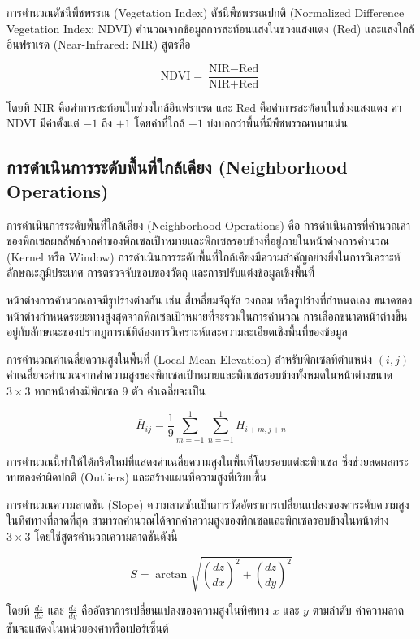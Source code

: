 \begin{ex}
การคำนวณดัชนีพืชพรรณ (Vegetation Index) ดัชนีพืชพรรณปกติ (Normalized Difference Vegetation Index: NDVI) คำนวณจากข้อมูลการสะท้อนแสงในช่วงแสงแดง (Red) และแสงใกล้อินฟราเรด (Near-Infrared: NIR) สูตรคือ

\[
\text{NDVI} = \frac{\text{NIR} - \text{Red}}{\text{NIR} + \text{Red}}
\]

โดยที่ NIR คือค่าการสะท้อนในช่วงใกล้อินฟราเรด และ Red คือค่าการสะท้อนในช่วงแสงแดง ค่า NDVI มีค่าตั้งแต่ $-1$ ถึง $+1$ โดยค่าที่ใกล้ $+1$ บ่งบอกว่าพื้นที่มีพืชพรรณหนาแน่น
\end{ex}

\subsection{การดำเนินการระดับพื้นที่ใกล้เคียง (Neighborhood Operations)}

การดำเนินการระดับพื้นที่ใกล้เคียง (Neighborhood Operations) คือ การดำเนินการที่คำนวณค่าของพิกเซลผลลัพธ์จากค่าของพิกเซลเป้าหมายและพิกเซลรอบข้างที่อยู่ภายในหน้าต่างการคำนวณ (Kernel หรือ Window) การดำเนินการระดับพื้นที่ใกล้เคียงมีความสำคัญอย่างยิ่งในการวิเคราะห์ลักษณะภูมิประเทศ การตรวจจับขอบของวัตถุ และการปรับแต่งข้อมูลเชิงพื้นที่

หน้าต่างการคำนวณอาจมีรูปร่างต่างกัน เช่น สี่เหลี่ยมจัตุรัส วงกลม หรือรูปร่างที่กำหนดเอง ขนาดของหน้าต่างกำหนดระยะทางสูงสุดจากพิกเซลเป้าหมายที่จะรวมในการคำนวณ การเลือกขนาดหน้าต่างขึ้นอยู่กับลักษณะของปรากฏการณ์ที่ต้องการวิเคราะห์และความละเอียดเชิงพื้นที่ของข้อมูล

\begin{ex}
การคำนวณค่าเฉลี่ยความสูงในพื้นที่ (Local Mean Elevation) สำหรับพิกเซลที่ตำแหน่ง $(i, j)$ ค่าเฉลี่ยจะคำนวณจากค่าความสูงของพิกเซลเป้าหมายและพิกเซลรอบข้างทั้งหมดในหน้าต่างขนาด $3 \times 3$ หากหน้าต่างมีพิกเซล 9 ตัว ค่าเฉลี่ยจะเป็น

\[
\bar{H}_{ij} = \frac{1}{9} \sum_{m=-1}^{1} \sum_{n=-1}^{1} H_{i+m, j+n}
\]

การคำนวณนี้ทำให้ได้กริดใหม่ที่แสดงค่าเฉลี่ยความสูงในพื้นที่โดยรอบแต่ละพิกเซล ซึ่งช่วยลดผลกระทบของค่าผิดปกติ (Outliers) และสร้างแผนที่ความสูงที่เรียบขึ้น
\end{ex}

\begin{ex}
การคำนวณความลาดชัน (Slope) ความลาดชันเป็นการวัดอัตราการเปลี่ยนแปลงของค่าระดับความสูงในทิศทางที่ลาดที่สุด สามารถคำนวณได้จากค่าความสูงของพิกเซลและพิกเซลรอบข้างในหน้าต่าง $3 \times 3$ โดยใช้สูตรคำนวณความลาดชันดังนี้

\[
S = \arctan \sqrt{\left( \frac{dz}{dx} \right)^2 + \left( \frac{dz}{dy} \right)^2}
\]

โดยที่ $\frac{dz}{dx}$ และ $\frac{dz}{dy}$ คืออัตราการเปลี่ยนแปลงของความสูงในทิศทาง $x$ และ $y$ ตามลำดับ ค่าความลาดชันจะแสดงในหน่วยองศาหรือเปอร์เซ็นต์
\end{ex}

